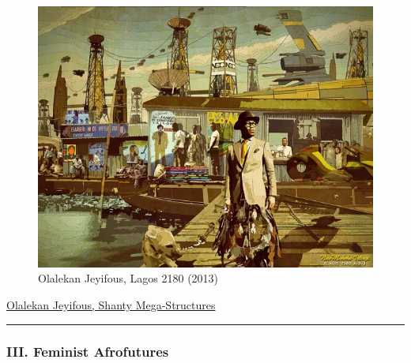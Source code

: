 \documentclass[
  letterpaper,
  DIV=11,
  numbers=noendperiod]{scrartcl}
\begin{document}
\begin{figure}

\includegraphics{../img/lagos-2180.jpg} \hfill{}

\caption{Olalekan Jeyifous, Lagos 2180 (2013)}

\end{figure}

\href{https://jeyifo.us/SMS}{Olalekan Jeyifous, Shanty Mega-Structures}

\begin{center}\rule{0.5\linewidth}{0.5pt}\end{center}

\hypertarget{iii.-feminist-afrofutures}{%
\subsubsection{III. Feminist
Afrofutures}\label{iii.-feminist-afrofutures}}
\end{document}
